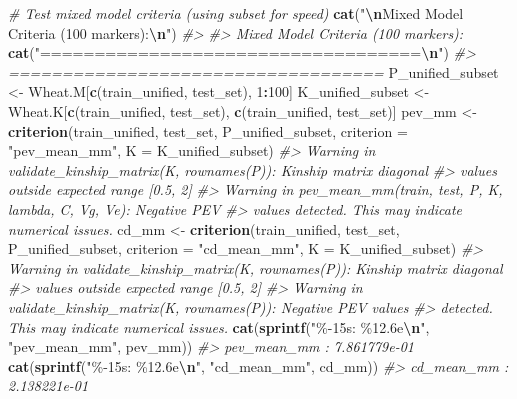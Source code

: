 \documentclass[
]{article}
\newenvironment{Shaded}{\begin{snugshade}}{\end{snugshade}}
\newcommand{\AttributeTok}[1]{\textcolor[rgb]{0.13,0.29,0.53}{#1}}
\newcommand{\CommentTok}[1]{\textcolor[rgb]{0.56,0.35,0.01}{\textit{#1}}}
\newcommand{\DecValTok}[1]{\textcolor[rgb]{0.00,0.00,0.81}{#1}}
\newcommand{\FunctionTok}[1]{\textcolor[rgb]{0.13,0.29,0.53}{\textbf{#1}}}
\newcommand{\NormalTok}[1]{#1}
\newcommand{\OtherTok}[1]{\textcolor[rgb]{0.56,0.35,0.01}{#1}}
\newcommand{\SpecialCharTok}[1]{\textcolor[rgb]{0.81,0.36,0.00}{\textbf{#1}}}
\newcommand{\StringTok}[1]{\textcolor[rgb]{0.31,0.60,0.02}{#1}}
\begin{document}
\begin{Shaded}
\begin{Highlighting}[]
\CommentTok{\# Test mixed model criteria (using subset for speed)}
\FunctionTok{cat}\NormalTok{(}\StringTok{"}\SpecialCharTok{\textbackslash{}n}\StringTok{Mixed Model Criteria (100 markers):}\SpecialCharTok{\textbackslash{}n}\StringTok{"}\NormalTok{)}
\CommentTok{\#\textgreater{} }
\CommentTok{\#\textgreater{} Mixed Model Criteria (100 markers):}
\FunctionTok{cat}\NormalTok{(}\StringTok{"===================================}\SpecialCharTok{\textbackslash{}n}\StringTok{"}\NormalTok{)}
\CommentTok{\#\textgreater{} ===================================}
\NormalTok{P\_unified\_subset }\OtherTok{\textless{}{-}}\NormalTok{ Wheat.M[}\FunctionTok{c}\NormalTok{(train\_unified, test\_set), }\DecValTok{1}\SpecialCharTok{:}\DecValTok{100}\NormalTok{]}
\NormalTok{K\_unified\_subset }\OtherTok{\textless{}{-}}\NormalTok{ Wheat.K[}\FunctionTok{c}\NormalTok{(train\_unified, test\_set), }\FunctionTok{c}\NormalTok{(train\_unified, test\_set)]}
\NormalTok{pev\_mm }\OtherTok{\textless{}{-}} \FunctionTok{criterion}\NormalTok{(train\_unified, test\_set, P\_unified\_subset, }\AttributeTok{criterion =} \StringTok{"pev\_mean\_mm"}\NormalTok{, }\AttributeTok{K =}\NormalTok{ K\_unified\_subset)}
\CommentTok{\#\textgreater{} Warning in validate\_kinship\_matrix(K, rownames(P)): Kinship matrix diagonal}
\CommentTok{\#\textgreater{} values outside expected range [0.5, 2]}
\CommentTok{\#\textgreater{} Warning in pev\_mean\_mm(train, test, P, K, lambda, C, Vg, Ve): Negative PEV}
\CommentTok{\#\textgreater{} values detected. This may indicate numerical issues.}
\NormalTok{cd\_mm }\OtherTok{\textless{}{-}} \FunctionTok{criterion}\NormalTok{(train\_unified, test\_set, P\_unified\_subset, }\AttributeTok{criterion =} \StringTok{"cd\_mean\_mm"}\NormalTok{, }\AttributeTok{K =}\NormalTok{ K\_unified\_subset)}
\CommentTok{\#\textgreater{} Warning in validate\_kinship\_matrix(K, rownames(P)): Kinship matrix diagonal}
\CommentTok{\#\textgreater{} values outside expected range [0.5, 2]}
\CommentTok{\#\textgreater{} Warning in validate\_kinship\_matrix(K, rownames(P)): Negative PEV values}
\CommentTok{\#\textgreater{} detected. This may indicate numerical issues.}
\FunctionTok{cat}\NormalTok{(}\FunctionTok{sprintf}\NormalTok{(}\StringTok{"\%{-}15s: \%12.6e}\SpecialCharTok{\textbackslash{}n}\StringTok{"}\NormalTok{, }\StringTok{"pev\_mean\_mm"}\NormalTok{, pev\_mm))}
\CommentTok{\#\textgreater{} pev\_mean\_mm    : 7.861779e{-}01}
\FunctionTok{cat}\NormalTok{(}\FunctionTok{sprintf}\NormalTok{(}\StringTok{"\%{-}15s: \%12.6e}\SpecialCharTok{\textbackslash{}n}\StringTok{"}\NormalTok{, }\StringTok{"cd\_mean\_mm"}\NormalTok{, cd\_mm))}
\CommentTok{\#\textgreater{} cd\_mean\_mm     : 2.138221e{-}01}


\end{Highlighting}
\end{Shaded}
\end{document}

